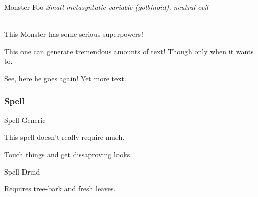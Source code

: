 \documentclass[10pt,twoside]{article}
\begin{document}
\begin{multicols}{2}
\begin{monsterbox}{Monster Foo}
    \textit{Small metasyntatic variable (golbinoid), neutral evil}\\
    \hline
    \basics[%
    armorclass = 12,
    hitpoints  = 16 (3d8 + 3),
    speed      = 50 ft
    ]
    \hline
    \stats[
    STR = 12 (+1),
    DEX = 14 (+2)
    ]
    \hline
    \details[%
    languages = {Common Lisp, Erlang},
    ]
    \hline \\[1mm]
    \begin{monsteraction}
        This Monster has some serious superpowers!
    \end{monsteraction}
    \begin{monsteraction}
        This one can generate tremendous amounts of text! Though only when it wants to.
    \end{monsteraction}

    \begin{monsteraction}
    See, here he goes again! Yet more text.
    \end{monsteraction}
\end{monsterbox}

\subsubsection*{Spell}

\begin{spellbox}{Spell Generic}
    \spelldetails[]
    \begin{spellaction}[Materials]
    This spell doesn't really require much.
    \end{spellaction}

    \begin{spellaction}[Effect]
    Touch things and get dissaproving looks.
    \end{spellaction}
\end{spellbox}

\begin{spellbox}{Spell Druid}
    \spelldetails[%
    level   = 9,
    school  = Transmutation,
    time    = 1 action,
    range   = Touch,
    duration = Instant,
    components = {S,M},
    restrict = Druid,
    ritual = yes
    ]
    \begin{spellaction}[Materials]
    Requires tree-bark and fresh leaves.
    \end{spellaction}


\end{spellbox}
\end{multicols}
\end{document}
